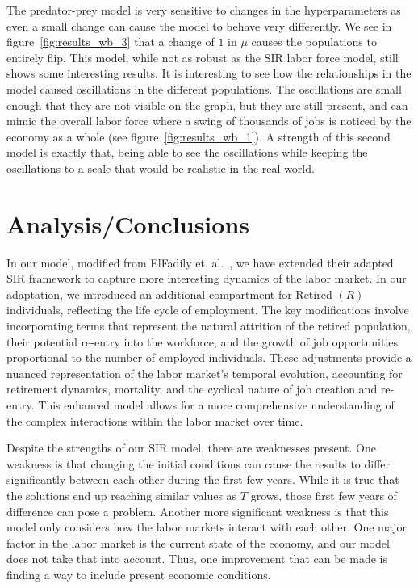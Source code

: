 \documentclass[11pt]{amsart}
\begin{document}
The predator-prey model is very sensitive to changes in the hyperparameters as even a small change can cause the model to behave very 
differently. We see in figure~\ref{fig:results_wb_3} that a change of $1$ in $\mu$ causes the populations to entirely flip. 
This model, while not as robust as the SIR labor force model, still shows some interesting results. It is interesting to see how the relationships in the model
caused oscillations in the different populations. The oscillations are small enough that they are not visible on the graph, but they are still present, and can mimic the overall 
labor force where a swing of thousands of jobs is noticed by the economy as a whole (see figure~\ref{fig:results_wb_1}). 
A strength of this second model is exactly that, being able to see the oscillations while keeping the oscillations to a scale that would be realistic in the real world.


\section{Analysis/Conclusions}

In our model, modified from ElFadily et. al.~\cite{ElFadily}, we have extended their adapted SIR framework to capture more interesting dynamics of the labor market. 
In our adaptation, 
we introduced an additional compartment for Retired $(R)$ individuals, reflecting the life cycle of employment. The key 
modifications involve incorporating terms that represent the natural attrition of the retired population, their potential re-entry into 
the workforce, and the growth of job opportunities proportional to the number of employed individuals. These adjustments provide 
a nuanced representation of the labor market's temporal evolution, accounting for retirement dynamics, mortality, and the cyclical 
nature of job creation and re-entry. This enhanced model allows for a more comprehensive understanding of the complex interactions 
within the labor market over time.

Despite the strengths of our SIR model, there are weaknesses present. One weakness is that changing the initial conditions can cause 
the results to differ significantly between each other during the first few years. While it is true that the solutions 
end up reaching similar values as $T$ grows, those first few years of difference can pose a problem. Another more significant 
weakness is that this model only considers how the labor markets interact with each other. One major factor in the labor market 
is the current state of the economy, and our model does not take that into account. Thus, one improvement that can be made is finding a way to 
include present economic conditions.
\end{document}
